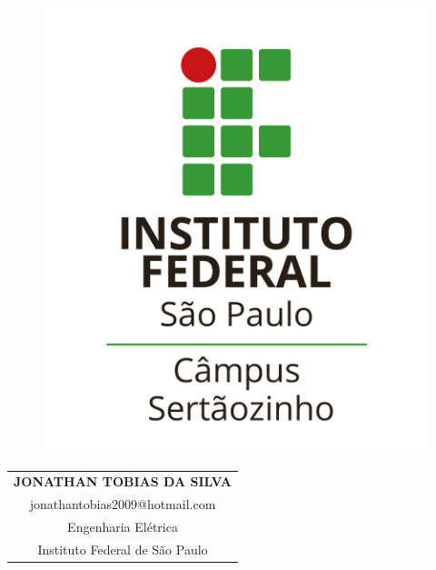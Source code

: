 
\begin{minipage}{0.23\linewidth}
	\begin{figure}[H]
		\includegraphics[scale=0.30]{Figuras/logo-ifsp}
	\end{figure}
\end{minipage}
\begin{minipage}{0.39\linewidth}
	\begin{table}[H]
	\def\arraystretch{1} %
		\begin{tabular}{c}
			\textbf{JONATHAN TOBIAS DA SILVA} \\
			jonathantobias2009@hotmail.com \\
			Engenharia Elétrica \\
			Instituto Federal de São Paulo
		\end{tabular}
	\end{table}
\end{minipage}
